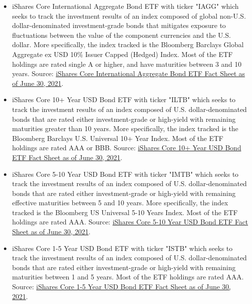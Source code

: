     \begin{itemize}
        \item iShares Core International Aggregate Bond ETF with ticker "IAGG" which seeks to track the investment results of an index composed of global non-U.S. dollar-denominated investment-grade bonds that mitigates exposure to fluctuations between the value of the component currencies and the U.S. dollar. More specifically, the index tracked is the Bloomberg Barclays Global Aggregate ex USD 10\% Issuer Capped (Hedged) Index. Most of the ETF holdings are rated single A or higher, and have maturities between 3 and 10 years. Source: \href{https://www.ishares.com/us/literature/fact-sheet/iagg-ishares-core-international-aggregate-bond-etf-fund-fact-sheet-en-us.pdf}{iShares Core International Aggregate Bond ETF Fact Sheet as of June 30, 2021}.%
        
        \item iShares Core 10+ Year USD Bond ETF with ticker "ILTB" which seeks to track the investment results of an index composed of U.S. dollar-denominated bonds that are rated either investment-grade or high-yield with remaining maturities greater than 10 years. More specifically, the index tracked is the Bloomberg Barclays U.S. Universal 10+ Year Index. Most of the ETF holdings are rated AAA or BBB. Source: \href{https://www.ishares.com/us/literature/fact-sheet/iltb-ishares-core-10-year-usd-bond-etf-fund-fact-sheet-en-us.pdf}{iShares Core 10+ Year USD Bond ETF Fact Sheet as of June 30, 2021}.%
        
        \item iShares Core 5-10 Year USD Bond ETF with ticker "IMTB" which seeks to track the investment results of an index composed of U.S. dollar-denominated bonds that are rated either investment-grade or high-yield with remaining effective maturities between 5 and 10 years. More specifically, the index tracked is the Bloomberg US Universal 5-10 Years Index. Most of the ETF holdings are rated AAA. Source: \href{https://www.ishares.com/us/literature/fact-sheet/imtb-ishares-core-5-10-year-usd-bond-etf-fund-fact-sheet-en-us.pdf}{iShares Core 5-10 Year USD Bond ETF Fact Sheet as of June 30, 2021}.%
        
        \item iShares Core 1-5 Year USD Bond ETF with ticker "ISTB" which seeks to track the investment results of an index composed of U.S. dollar-denominated bonds that are rated either investment-grade or high-yield with remaining maturities between 1 and 5 years. Most of the ETF holdings are rated AAA. Source: \href{https://www.ishares.com/us/literature/fact-sheet/istb-ishares-core-1-5-year-usd-bond-etf-fund-fact-sheet-en-us.pdf}{iShares Core 1-5 Year USD Bond ETF Fact Sheet as of June 30, 2021}.%
    \end{itemize}
    
